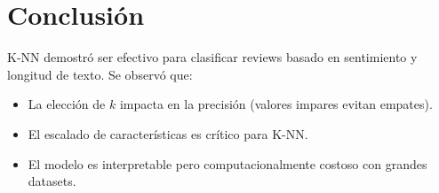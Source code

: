 \documentclass{article}
\begin{document}
\section{Conclusión}
K-NN demostró ser efectivo para clasificar reviews basado en sentimiento y longitud de texto. Se observó que:
\begin{itemize}
    \item La elección de $k$ impacta en la precisión (valores impares evitan empates).
    \item El escalado de características es crítico para K-NN.
    \item El modelo es interpretable pero computacionalmente costoso con grandes datasets.
\end{itemize}
\end{document}
